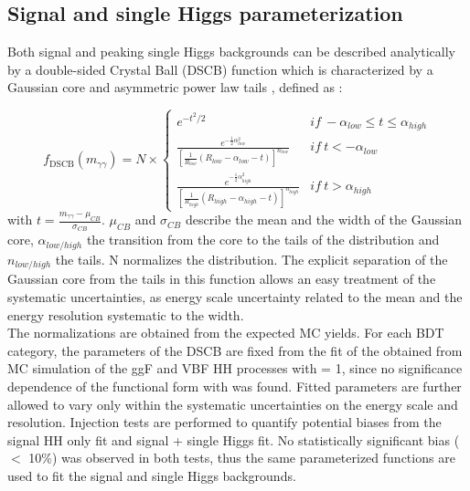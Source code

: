 \subsection{Signal and single Higgs parameterization}
\label{HHyybb:Modelling:Sig}

Both signal and peaking single Higgs backgrounds can be described analytically by a double-sided Crystal Ball (DSCB) function which is characterized by a Gaussian core and asymmetric power law tails \cite{Higgs_2018}, defined as :

\begin{equation}
    f_{\mathrm{DSCB}}\left(m_{\gamma \gamma}\right)=N \times\left\{\begin{array}{ll}
e^{-t^{2} / 2} &  if \ -\alpha_{low } \leq t \leq \alpha_{high } \\

\frac{e^{-\frac{1}{2} \alpha_{low }^{2}}} {  \left[  \frac{1}{ R_{low} } \left(R_{low }-\alpha_{low }-t\right) \right]^{n_{low }}} & if \ t<-\alpha_{low } \\

\frac{e^{-\frac{1}{2} \alpha_{high }^{2}}} {  \left[  \frac{1}{ R_{high} } \left(R_{high }-\alpha_{high }-t\right) \right]^{n_{high }}} &  if \ t>\alpha_{high }
\end{array}\right.
\end{equation}
with $t = \frac{m_{\gamma\gamma} - \mu_{CB}}{\sigma_{CB}}$. $\mu_{CB}$ and $\sigma_{CB}$ describe the mean and the width of the Gaussian core, $\alpha_{low/high}$ the transition from the core to the tails of the distribution and $n_{low/high}$ the tails. N normalizes the distribution. The explicit separation of the Gaussian core from the tails in this function allows an easy treatment of the systematic uncertainties, as energy scale uncertainty related to the mean and the energy resolution systematic to the width.\\
The normalizations are obtained from the expected MC yields. For each BDT category, the parameters of the DSCB are fixed from the fit of the \myy obtained from MC simulation of the ggF and VBF HH processes with \kl = 1, since no significance dependence of the functional form with \kl was found. Fitted parameters are further allowed to vary only within the systematic uncertainties on the energy scale and resolution. Injection tests are performed to quantify potential biases from the signal HH only fit and signal + single Higgs fit. No statistically significant bias ($<$ 10\%) was observed in both tests, thus the same parameterized functions are used to fit the signal and single Higgs backgrounds.    

